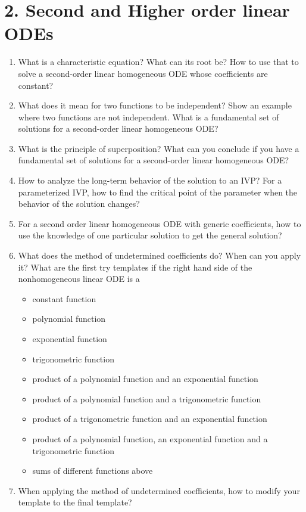 \documentclass[11pt]{article}
\begin{document}
\section*{2. Second and Higher order linear ODEs}
\begin{enumerate}
\item What is a characteristic equation? What can its root be? How to use that to solve a
second-order linear homogeneous ODE whose coefficients are constant? 
\item What does it mean for two functions to be independent? Show an example where two
functions are not independent. What is a fundamental set of solutions for a second-order
linear homogeneous ODE? 
\item What is the principle of superposition? What can you conclude if you have a fundamental
set of solutions for a second-order linear homogeneous ODE? 
\item How to analyze the long-term behavior of the solution to an IVP? For a parameterized IVP, how to find the critical point of the parameter when the behavior of the solution changes? 
\item For a second order linear homogeneous ODE with generic coefficients, how to use the knowledge of one particular solution to get the general solution? 
\item What does the method of undetermined coefficients do? When can you apply it? What are the first try templates if the right hand side of the nonhomogeneous linear ODE is a
\begin{itemize}
\item constant function
\item polynomial function
\item exponential function
\item trigonometric function
\item product of a polynomial function and an exponential function
\item product of a polynomial function and a trigonometric function
\item product of a trigonometric function and an exponential function
\item product of a polynomial function, an exponential function and a trigonometric function
\item sums of different functions above
\end{itemize}
\item When applying the method of undetermined coefficients, how to modify your template to the final template? 

\end{enumerate}
\end{document}
